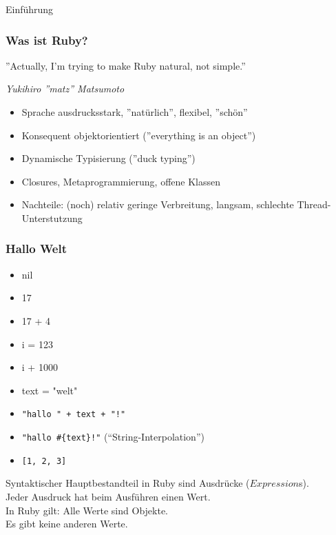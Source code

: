 \documentclass{beamer}
\begin{document}
\lstset{language=Ruby}
\lstset{basicstyle=\small,numbers=none, numberstyle=\tiny, numbersep=5pt}


\begin{frame}
\titlepage
\end{frame}

\begin{frame}{Einführung}
\frametitle{Was ist Ruby?}

\begin{center}
''Actually, I'm trying to make Ruby natural, not simple.'' 
\end{center}
\begin{flushright}
\emph{Yukihiro ''matz'' Matsumoto}
\end{flushright}



\begin{itemize}
\pause \item Sprache ausdrucksstark\pause, ''natürlich''\pause, flexibel\pause, ''schön''
\pause \item Konsequent objektorientiert (''everything is an object'')
\pause \item Dynamische Typisierung (''duck typing'')
\pause \item Closures, Metaprogrammierung, offene Klassen
\pause \item Nachteile: (noch) relativ geringe Verbreitung\pause,  langsam\pause, 
              schlechte Thread-Unterstutzung
\end{itemize}
\end{frame}

\begin{frame}[fragile]
  \frametitle{Hallo Welt}
  \begin{itemize}[<+->]
  \item nil
  \item 17
  \item 17 + 4
  \item i = 123
  \item i + 1000
  \item text = "welt"
  \item \verb|"hallo " + text + "!"|
  \item \verb|"hallo #{text}!"| \hspace{5em}  (``String-Interpolation'')
  \item \verb|[1, 2, 3]|
  \end{itemize}
  \pause
  Syntaktischer Hauptbestandteil in Ruby sind Ausdrücke ($Expression$s).\\
  Jeder Ausdruck hat beim Ausführen einen Wert. \\
  
  In Ruby gilt: Alle Werte sind Objekte.\\
  Es gibt keine anderen Werte.

\end{frame}
\end{document}

